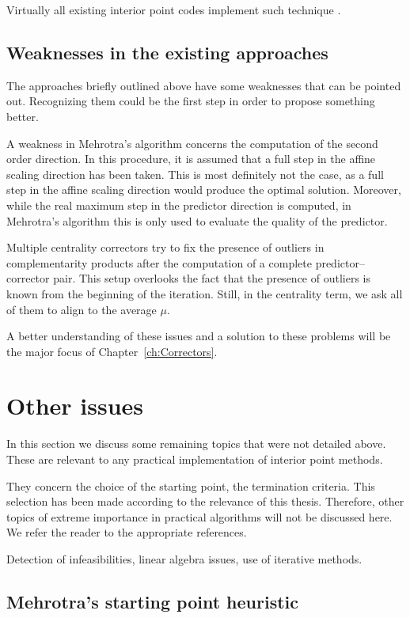 Virtually all existing interior point codes implement such technique 
\cite[Appendix B]{ipm:Wright97}.

%
%
\subsection{Weaknesses in the existing approaches}

The approaches briefly outlined above have some weaknesses that 
can be pointed out. Recognizing them could be the first step in 
order to propose something better.

A weakness in Mehrotra's algorithm concerns the computation of the 
second order direction. In this procedure, it is assumed that a 
full step in the affine scaling direction has been taken. This is 
most definitely not the case, as a full step in the affine scaling 
direction would produce the optimal solution. Moreover, while
the real maximum step in the predictor direction is computed, 
in Mehrotra's algorithm this is only used to evaluate the quality 
of the predictor.

Multiple centrality correctors try to fix the presence of outliers in 
complementarity products after the computation of a complete 
predictor--corrector pair. This setup overlooks the fact that the 
presence of outliers is known from the beginning of the iteration. 
Still, in the centrality term,  we ask all of them to align to the 
average $\mu$.

A better understanding of these issues and a solution to these
problems will be the major focus of Chapter~\ref{ch:Correctors}.

%
%
\section{Other issues}

In this section we discuss some remaining topics that were not
detailed above. These are relevant to any practical implementation
of interior point methods.

They concern the choice of the starting point, the termination
criteria. This selection has been made according to the relevance
of this thesis.
Therefore, other topics of extreme importance in practical algorithms
will not be discussed here. We refer the reader to the appropriate
references.

Detection of infeasibilities, linear algebra issues, use of iterative
methods.

%
%
\subsection{Mehrotra's starting point heuristic}

